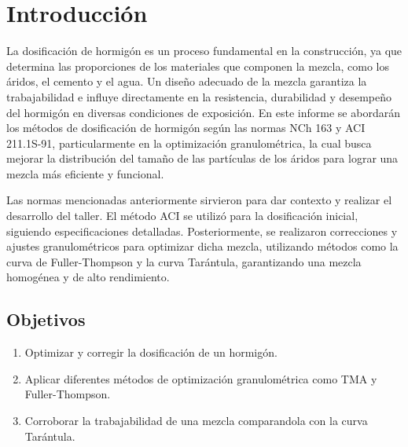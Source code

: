 \section{Introducción}

La dosificación de hormigón es un proceso fundamental en la construcción, ya que determina las proporciones de los materiales que componen la mezcla, como los áridos, el cemento y el agua. 
Un diseño adecuado de la mezcla garantiza la trabajabilidad e influye directamente en la resistencia, durabilidad y desempeño del hormigón en diversas condiciones de exposición. 
En este informe se abordarán los métodos de dosificación de hormigón según las normas NCh 163 y ACI 211.1S-91, particularmente en la optimización granulométrica, la cual busca mejorar la distribución del tamaño de las partículas de los áridos para lograr una mezcla más eficiente y funcional.

Las normas mencionadas anteriormente sirvieron para dar contexto y realizar el desarrollo del taller. El método ACI se utilizó para la dosificación inicial, siguiendo especificaciones detalladas. Posteriormente, se realizaron correcciones y ajustes granulométricos para optimizar dicha mezcla, utilizando métodos como la curva de Fuller-Thompson y la curva Tarántula, garantizando una mezcla homogénea y de alto rendimiento.

\subsection{Objetivos}

\begin{enumerate}
    \item Optimizar y corregir la dosificación de un hormigón.
    \item Aplicar diferentes métodos de optimización granulométrica como TMA y Fuller-Thompson.
    \item Corroborar la trabajabilidad de una mezcla comparandola con la curva Tarántula.
\end{enumerate}